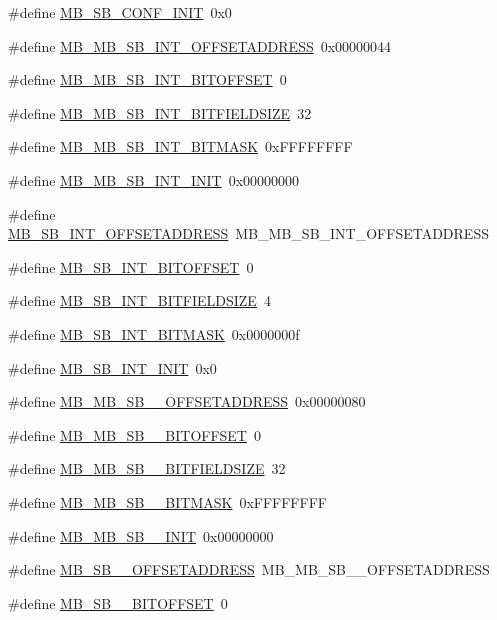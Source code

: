 \begin{DoxyCompactItemize}
\#define \hyperlink{a00562_ac844cd38a00c745526162b908884b9d5}{MB\_\-SB\_\-CONF\_\-INIT}~0x0
\item 
\#define \hyperlink{a00562_aaf3221e349563181a33ba0843042eb9d}{MB\_\-MB\_\-SB\_\-INT\_\-OFFSETADDRESS}~0x00000044
\item 
\#define \hyperlink{a00562_a58c548799f52cff40bf3d94bd4154292}{MB\_\-MB\_\-SB\_\-INT\_\-BITOFFSET}~0
\item 
\#define \hyperlink{a00562_a557683e53761f00bd9c5c0bf723fbc0a}{MB\_\-MB\_\-SB\_\-INT\_\-BITFIELDSIZE}~32
\item 
\#define \hyperlink{a00562_a217857e753f22631a4ea74b7166c22df}{MB\_\-MB\_\-SB\_\-INT\_\-BITMASK}~0xFFFFFFFF
\item 
\#define \hyperlink{a00562_ab97e8b3330bc82ba4c36f499f8ff1e9a}{MB\_\-MB\_\-SB\_\-INT\_\-INIT}~0x00000000
\item 
\#define \hyperlink{a00562_abe34d4d6b4bc51e3bea5a1fa2e478e54}{MB\_\-SB\_\-INT\_\-OFFSETADDRESS}~MB\_\-MB\_\-SB\_\-INT\_\-OFFSETADDRESS
\item 
\#define \hyperlink{a00562_a9c3af46d5606a6e7e61d674fa2637fa3}{MB\_\-SB\_\-INT\_\-BITOFFSET}~0
\item 
\#define \hyperlink{a00562_a203d0aa8cdd507ef4498527c18e35267}{MB\_\-SB\_\-INT\_\-BITFIELDSIZE}~4
\item 
\#define \hyperlink{a00562_a354b62db59cc4e5a0ab67a8b4d260326}{MB\_\-SB\_\-INT\_\-BITMASK}~0x0000000f
\item 
\#define \hyperlink{a00562_a7a51e5f5a292ff0557e0f9106bf1ea11}{MB\_\-SB\_\-INT\_\-INIT}~0x0
\item 
\#define \hyperlink{a00562_aa21b93b1cc20d455d00e7358f5651b2f}{MB\_\-MB\_\-SB\_\_\-OFFSETADDRESS}~0x00000080
\item 
\#define \hyperlink{a00562_a29bc6720abd22fcd87f1458852af7a7b}{MB\_\-MB\_\-SB\_\_\-BITOFFSET}~0
\item 
\#define \hyperlink{a00562_a3d01381043865fd76257e1d3982cdf0f}{MB\_\-MB\_\-SB\_\_\-BITFIELDSIZE}~32
\item 
\#define \hyperlink{a00562_a484ae28fbbfc9a5ae0222c6828eeccb3}{MB\_\-MB\_\-SB\_\_\-BITMASK}~0xFFFFFFFF
\item 
\#define \hyperlink{a00562_adf23d1d0f145253a7e26cbd3b396ec59}{MB\_\-MB\_\-SB\_\_\-INIT}~0x00000000
\item 
\#define \hyperlink{a00562_af531a6325526adfff3ea06bef0036c6d}{MB\_\-SB\_\_\-OFFSETADDRESS}~MB\_\-MB\_\-SB\_\_\-OFFSETADDRESS
\item 
\#define \hyperlink{a00562_ac22daccb809dff71c03e85636a9a5054}{MB\_\-SB\_\_\-BITOFFSET}~0

\end{DoxyCompactItemize}
